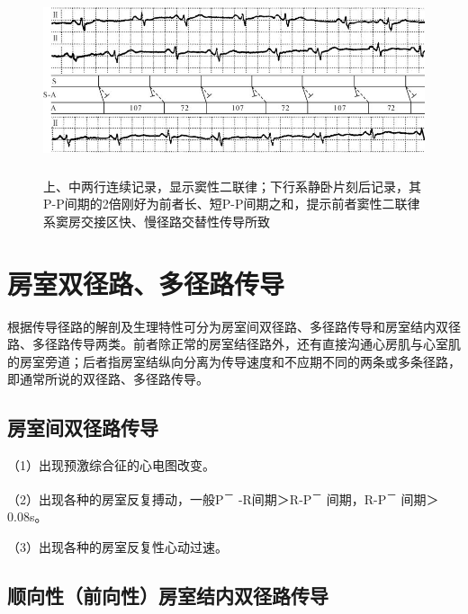 \begin{figure}[!htbp]
 \centering
 \includegraphics[width=5.69792in,height=2.16667in]{./images/Image00413.jpg}
 \captionsetup{justification=centering}
 \caption{上、中两行连续记录，显示窦性二联律；下行系静卧片刻后记录，其P-P间期的2倍刚好为前者长、短P-P间期之和，提示前者窦性二联律系窦房交接区快、慢径路交替性传导所致}
 \label{fig25-2}
  \end{figure} 

\protect\hypertarget{text00032.htmlux5cux23subid380}{}{}

\section{房室双径路、多径路传导}

根据传导径路的解剖及生理特性可分为房室间双径路、多径路传导和房室结内双径路、多径路传导两类。前者除正常的房室结径路外，还有直接沟通心房肌与心室肌的房室旁道；后者指房室结纵向分离为传导速度和不应期不同的两条或多条径路，即通常所说的双径路、多径路传导。

\protect\hypertarget{text00032.htmlux5cux23subid381}{}{}

\subsection{房室间双径路传导}

（1）出现预激综合征的心电图改变。

（2）出现各种的房室反复搏动，一般P\textsuperscript{－}
-R间期＞R-P\textsuperscript{－} 间期，R-P\textsuperscript{－}
间期＞0.08s。

（3）出现各种的房室反复性心动过速。

\protect\hypertarget{text00032.htmlux5cux23subid382}{}{}

\subsection{顺向性（前向性）房室结内双径路传导}

